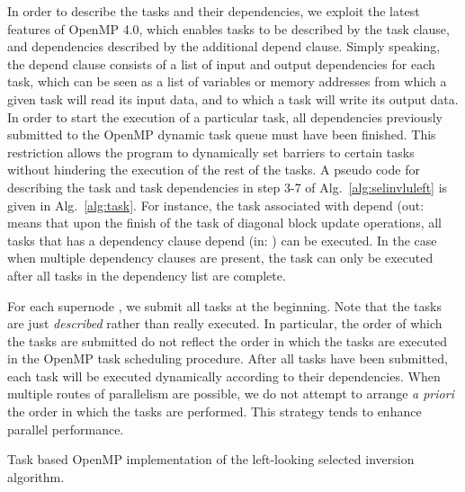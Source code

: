 \documentclass[10pt, conference, compsocconf,letterpaper,twocolumn]{IEEEtran}
\begin{document}
In order to describe the tasks and their dependencies, 
we exploit the latest features of OpenMP 4.0, which enables tasks to be described by the \textsf{task} clause, and dependencies described by the additional \textsf{depend} clause.  Simply speaking, the \textsf{depend} clause consists of a list of input and output dependencies for each task, which can be seen as a list of variables or memory addresses from which a given task will read its input data, and to which a task will write its output data.
In order to start the execution of a particular task, all dependencies previously submitted to the OpenMP dynamic task queue must have been finished. This restriction allows the program to dynamically set barriers to certain tasks without hindering the execution of the rest of the tasks.  
A pseudo code for describing the task and task dependencies in step 3-7 of Alg.~\ref{alg:selinvluleft} is given in Alg.~\ref{alg:task}. For instance, the task associated with \textsf{depend (out: } means that upon the finish of the task of diagonal block update operations, all tasks that has a dependency clause \textsf{depend (in: )} can be executed. In the case when multiple dependency clauses are present, the task can only be executed after all tasks in the  dependency list are complete.


For each supernode , we submit all tasks at the beginning. Note that the tasks are just \textit{described} rather than really executed. In particular, the order of which the tasks are submitted do not reflect the order in which the tasks are executed in the OpenMP task scheduling procedure.
After all tasks have been submitted, each task will be executed dynamically according to their dependencies. When multiple routes of parallelism are possible, we do not attempt to arrange \textit{a priori} the order in which the tasks are performed. This strategy tends to enhance parallel performance. 







\begin{algorithm}[ht]
\DontPrintSemicolon
{}
  \caption{Task based OpenMP implementation of the left-looking selected inversion algorithm.}
  \label{alg:task}
\end{algorithm}
\end{document}
